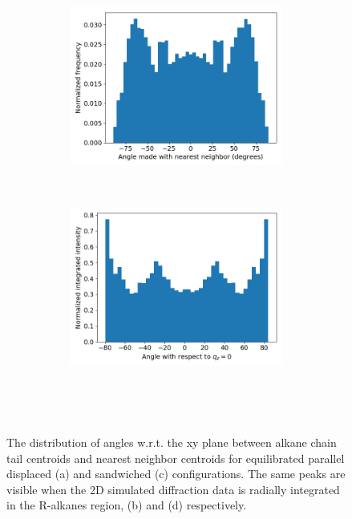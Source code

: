 \documentclass{article}
\begin{document}
\begin{figure}[!htb]
	\begin{subfigure}{\linewidth}
	\centering
		\begin{subfigure}{0.45\textwidth}
	        \centering
		        \includegraphics[width=\linewidth]{angles_traj_layered.png}
		        \caption{}~\label{fig:layered_tails}
		\end{subfigure}
		\begin{subfigure}{0.45\textwidth}
        	\centering
		        \includegraphics[width=\linewidth]{layered_angle_v_I.png}
		        \caption{}~\label{fig:layered_integration}
		\end{subfigure}
	\end{subfigure}
  \caption{The distribution of angles w.r.t. the xy plane between alkane chain tail centroids and nearest
  neighbor centroids for equilibrated parallel displaced (a) and sandwiched (c) configurations. The
  same peaks are visible when the 2D simulated diffraction data is radially integrated in the R-alkanes region,
  (b) and (d) respectively.}~\label{fig:tail_packing}
  \end{figure}
\end{document}

